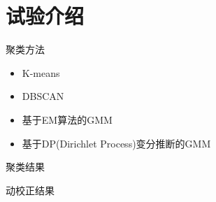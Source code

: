 \section{试验介绍}
\begin{frame}{聚类方法}
    \begin{itemize}
        \item K-means
        \item DBSCAN
        \item 基于EM算法的GMM
        \item 基于DP(Dirichlet Process)变分推断的GMM
    \end{itemize}
\end{frame}
 
\begin{frame}{聚类结果}
    
\end{frame}

\begin{frame}{动校正结果}
    \begin{figure}[ht]
        \centering
        \ 
    \end{figure}
\end{frame}